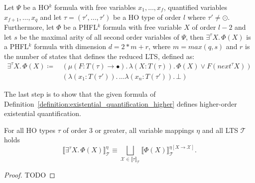 \begin{definition}
    \label{definition:existential_quantification_higher}
    Let $\Psi$ be a HO$^k$ formula with free variables $x_1, \dots, x_f$, quantified variables $x_{f+1}, \dots,
    x_q$ and let $\tau = (\tau', \dots, \tau')$ be a HO type of order $l$ where $\tau' \neq \odot$. Furthermore, let
    $\Phi$ be a PHFL$^k$
    formula with free variable $X$ of order $l - 2$ and let $s$ be the maximal arity
    of all second order variables of $\Psi$, then $\exists^{\tau}X .\,\Phi(X)$
    is a PHFL$^k$ formula with dimension $d = 2 * m + r$, where $m = max({q, s})$ and $r$ is the number of states that defines the reduced LTS,  defined as:
    \begin{align*}
        \exists^{\tau}X.\, \Phi(X) \coloneqq &\,(\mu (F \colon T(\tau) \rightarrow \bullet).\, \lambda (X \colon T(\tau)
        ).\,
        \Phi(X)
        \vee F(next^\tau X))\\&\,(\lambda (x_1 \colon T(\tau')).\, \dots \lambda (x_n \colon T(\tau')).\,\bot)
    \end{align*}
\end{definition}

The last step is to show that the given formula of Definition~\ref{definition:existential_quantification_higher} defines
higher-order existential quantification.

\begin{lemma}
    \label{lemma:existential_quantifier_higher}
    For all HO types $\tau$ of order $3$ or greater, all variable mappings $\eta$ and all LTS $\mathcal{T}$ holds
    \[\llbracket \exists^\tau X.\,\Phi(X)\rrbracket^\eta_\mathcal{T} \equiv \underset{\mathcal{X} \in \llbracket \tau
    \rrbracket_\mathcal{T}}{\bigsqcup} \llbracket \Phi(X) \rrbracket^{\eta[X\rightarrow \mathcal{X}]}_\mathcal{T}.\]
\end{lemma}

\begin{proof}
    TODO
\end{proof}